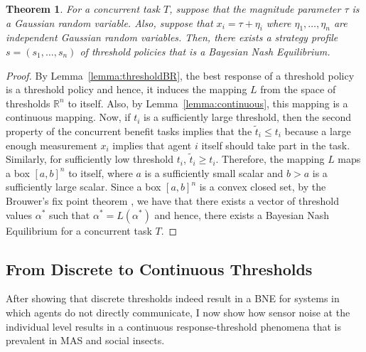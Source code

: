 \documentclass[defaultstyle,12pt]{thesis}
\newtheorem{theorem}{Theorem}
\newcommand{\R}{\mathbb{R}}    %
\begin{document}
\begin{theorem}\label{thrm:mainthrm}
For a concurrent task $T$, suppose that the magnitude parameter $\tau$ is a Gaussian random variable. Also, suppose that $x_i=\tau+\eta_i$ where $\eta_1,\ldots,\eta_n$ are independent Gaussian random variables. Then, there exists a strategy profile $s=(s_1,\ldots,s_n)$ of threshold policies that is a Bayesian Nash Equilibrium.
\end{theorem}
\begin{proof}
By Lemma~\ref{lemma:thresholdBR}, the best response of a threshold policy is a threshold policy and hence, it induces the mapping $L$ from the space of thresholds $\R^n$ to itself. Also, by Lemma~\ref{lemma:continuous}, this mapping is a continuous mapping. Now, if $t_i$ is a sufficiently large threshold, then the second property of the concurrent benefit tasks implies that the $\tilde{t}_i\leq t_i$ because a large enough measurement $x_i$ implies that agent $i$ itself should take part in the task. Similarly, for sufficiently low threshold $t_i$, $\tilde{t}_i\geq t_i$. Therefore, the mapping $L$ maps a box $[a,b]^n$ to itself, where $a$ is a sufficiently small scalar and $b>a$ is a sufficiently large scalar. Since a box $[a,b]^n$ is a convex closed set, by the Brouwer's fix point theorem \cite{Border1990}, we have that there exists a vector of threshold values $\alpha^*$ such that $\alpha^*=L(\alpha^*)$ and hence, there exists a Bayesian Nash Equilibrium for a concurrent task $T$.
\end{proof}


\subsection{From Discrete to Continuous Thresholds}\label{subsec:sigfun}
After showing that discrete thresholds indeed result in a BNE for systems in which agents do not directly communicate, I  now show how sensor noise at the individual level results in a continuous response-threshold phenomena that is prevalent in MAS and social insects. 
\end{document}
